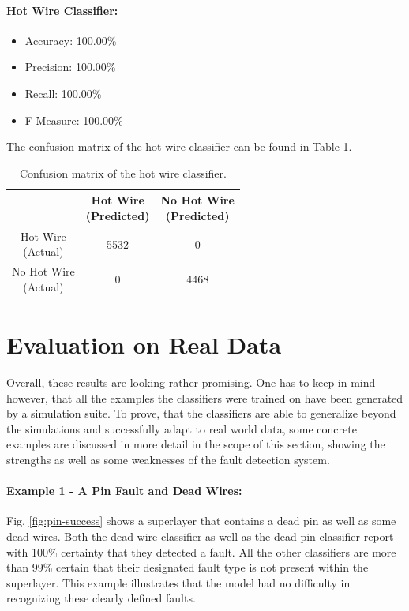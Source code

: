 \paragraph{Hot Wire Classifier:}
\begin{itemize}
  \item Accuracy: 100.00\%
  \item Precision: 100.00\%
  \item Recall: 100.00\%
  \item F-Measure: 100.00\%
\end{itemize}
The confusion matrix of the hot wire classifier can be found in Table
\ref{tbl:confusion-hotwire}.
\begin{table}[h]
  \centering
  \renewcommand\theadfont{\bfseries}
  \begin{tabular}{|c|c|c|}
    \hline
    & \thead{Hot Wire\\(Predicted)} & \thead{No Hot Wire\\(Predicted)} \\
    \hline
    \thead{Hot Wire\\(Actual)} & 5532 & 0\\
    \hline
    \thead{No Hot Wire\\(Actual)} & 0 & 4468\\
    \hline
  \end{tabular}
  \caption{Confusion matrix of the hot wire classifier.}
  \label{tbl:confusion-hotwire}
\end{table}

\section{Evaluation on Real Data}

Overall, these results are looking rather promising. One has to keep in mind
however, that all the examples the classifiers were trained on have
been generated by a simulation suite. To prove, that the classifiers
are able to generalize beyond the simulations and successfully adapt
to real world data, some concrete examples are discussed in more
detail in the scope of this section, showing the strengths as well as
some weaknesses of the fault detection system.

\paragraph{Example 1 - A Pin Fault and Dead Wires:}

Fig. \ref{fig:pin-success} shows a superlayer that contains a dead pin
as well as some dead wires.  Both the dead wire classifier as well as
the dead pin classifier report with 100\% certainty that they detected
a fault. All the other classifiers are more than 99\% certain that
their designated fault type is not present within the
superlayer. This example illustrates that the model had no difficulty
in recognizing these clearly defined faults.

